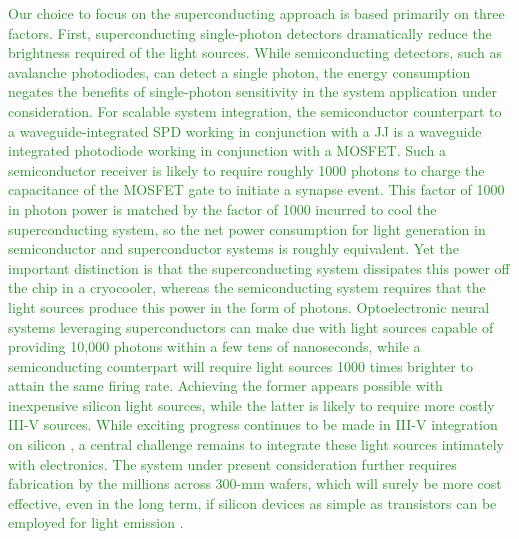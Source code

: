 \documentclass[twocolumn]{article}
\begin{document}
\textcolor{ForestGreen}{Our choice to focus on the superconducting approach is based primarily on three factors. First, superconducting single-photon detectors dramatically reduce the brightness required of the light sources. While semiconducting detectors, such as avalanche photodiodes, can detect a single photon, the energy consumption negates the benefits of single-photon sensitivity in the system application under consideration. For scalable system integration, the semiconductor counterpart to a waveguide-integrated SPD working in conjunction with a JJ is a waveguide integrated photodiode working in conjunction with a MOSFET. Such a semiconductor receiver is likely to require roughly 1000 photons to charge the capacitance of the MOSFET gate \cite{mi2017} to initiate a synapse event. This factor of 1000 in photon power is matched by the factor of 1000 incurred to cool the superconducting system, so the net power consumption for light generation in semiconductor and superconductor systems is roughly equivalent. Yet the important distinction is that the superconducting system dissipates this power off the chip in a cryocooler, whereas the semiconducting system requires that the light sources produce this power in the form of photons. Optoelectronic neural systems leveraging superconductors can make due with light sources capable of providing 10,000 photons within a few tens of nanoseconds, while a semiconducting counterpart will require light sources 1000 times brighter to attain the same firing rate. Achieving the former appears possible with inexpensive silicon light sources, while the latter is likely to require more costly III-V sources. While exciting progress continues to be made in III-V integration on silicon \cite{hala2020}, a central challenge remains to integrate these light sources intimately with electronics. The system under present consideration further requires fabrication by the millions across 300-mm wafers, which will surely be more cost effective, even in the long term, if silicon devices as simple as transistors can be employed for light emission \cite{buch2017}.}
\end{document}
